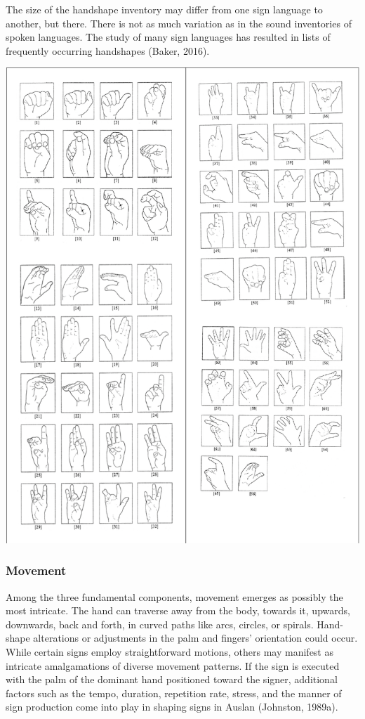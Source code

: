 The size of the handshape inventory may differ from one sign language to another, but there.
There is not as much variation as in the sound inventories of spoken languages.
The study of many sign languages has resulted in lists of frequently occurring handshapes (Baker, 2016).

\includegraphics[width=\textwidth]{figures/handshapes.png}

\subsubsection{Movement}

Among the three fundamental components, movement emerges as possibly the most intricate. The hand can traverse away from the body, towards it, upwards, downwards, back and forth, in curved paths like arcs, circles, or spirals. Hand-shape alterations or adjustments in the palm and fingers' orientation could occur. While certain signs employ straightforward motions, others may manifest as intricate amalgamations of diverse movement patterns. If the sign is executed with the palm of the dominant hand positioned toward the signer, additional factors such as the tempo, duration, repetition rate, stress, and the manner of sign production come into play in shaping signs in Auslan (Johnston, 1989a). \\

